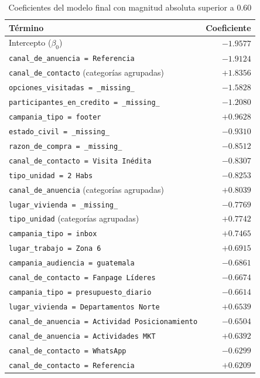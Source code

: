 \begin{table}[H]
\centering
\caption{Coeficientes del modelo final con magnitud absoluta superior a 0.60}
\label{anx:cuad-coef}
\small
\begin{tabular}{lr}
\hline
\textbf{Término} & \textbf{Coeficiente} \\
\hline
Intercepto ($\beta_0$)                              & $-1.9577$ \\
\texttt{canal\_de\_anuencia = Referencia}           & $-1.9124$ \\
\texttt{canal\_de\_contacto} (categorías agrupadas) & $+1.8356$ \\
\texttt{opciones\_visitadas = \_missing\_}          & $-1.5828$ \\
\texttt{participantes\_en\_credito = \_missing\_}   & $-1.2080$ \\
\texttt{campania\_tipo = footer}                    & $+0.9628$ \\
\texttt{estado\_civil = \_missing\_}                & $-0.9310$ \\
\texttt{razon\_de\_compra = \_missing\_}            & $-0.8512$ \\
\texttt{canal\_de\_contacto = Visita Inédita}       & $-0.8307$ \\
\texttt{tipo\_unidad = 2 Habs}                      & $-0.8253$ \\
\texttt{canal\_de\_anuencia} (categorías agrupadas) & $+0.8039$ \\
\texttt{lugar\_vivienda = \_missing\_}              & $-0.7769$ \\
\texttt{tipo\_unidad} (categorías agrupadas)        & $+0.7742$ \\
\texttt{campania\_tipo = inbox}                     & $+0.7465$ \\
\texttt{lugar\_trabajo = Zona 6}                    & $+0.6915$ \\
\texttt{campania\_audiencia = guatemala}            & $-0.6861$ \\
\texttt{canal\_de\_contacto = Fanpage Líderes}      & $-0.6674$ \\
\texttt{campania\_tipo = presupuesto\_diario}       & $-0.6614$ \\
\texttt{lugar\_vivienda = Departamentos Norte}      & $+0.6539$ \\
\texttt{canal\_de\_anuencia = Actividad Posicionamiento} & $-0.6504$ \\
\texttt{canal\_de\_anuencia = Actividades MKT}      & $+0.6392$ \\
\texttt{canal\_de\_contacto = WhatsApp}             & $-0.6299$ \\
\texttt{canal\_de\_contacto = Referencia}           & $+0.6209$ \\
\hline
\end{tabular}
\fuentepropia
\end{table}

